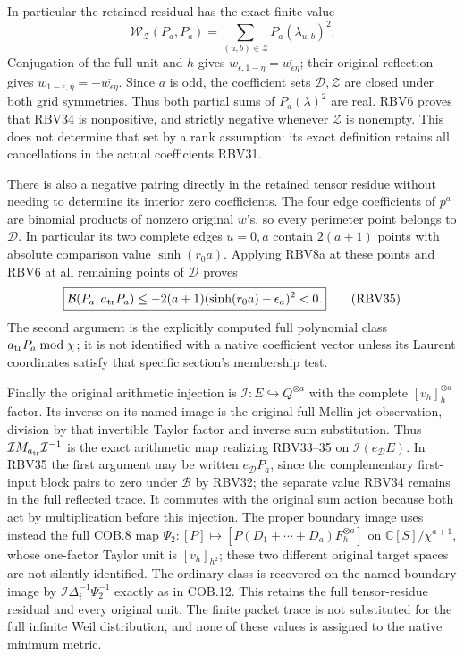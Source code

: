 In particular the retained residual has the exact finite value
\[
\mathcal W_{\mathcal Z}(P_a,P_a)
 =\sum_{(u,b)\in\mathcal Z}P_a(\lambda_{u,b})^2.
\tag{RBV34}
\]
Conjugation of the full unit and $h$ gives
$w_{\epsilon,1-\eta}=\overline{w_{\epsilon\eta}}$;
their original reflection gives
$w_{1-\epsilon,\eta}=-\overline{w_{\epsilon\eta}}$.
Since $a$ is odd, the coefficient sets $\mathcal D,\mathcal Z$
are closed under both grid symmetries. Thus both partial sums of
$P_a(\lambda)^2$ are real. RBV6 proves that RBV34 is nonpositive,
and strictly negative whenever $\mathcal Z$ is nonempty. This
does not determine that set by a rank assumption: its exact definition
retains all cancellations in the actual coefficients RBV31.

There is also a negative pairing directly in the retained tensor
residue without needing to determine its interior zero coefficients.
The four edge coefficients of $p^a$ are binomial products of
nonzero original $w$'s, so every perimeter point belongs to
$\mathcal D$. In particular its two complete edges $u=0,a$
contain $2(a+1)$ points with absolute comparison value
$\sinh(r_0a)$. Applying RBV8a at these points and RBV6 at all
remaining points of $\mathcal D$ proves
\[
\boxed{\mathcal B(P_a,a_{\rm tr}P_a)
 \le-2(a+1)(\sinh(r_0a)-\epsilon_a)^2<0.}\tag{RBV35}
\]
The second argument is the explicitly computed full polynomial
class $a_{\rm tr}P_a\bmod\chi$; it is not identified with a native
coefficient vector unless its Laurent coordinates satisfy that
specific section's membership test.

Finally the original arithmetic injection is
$\mathcal I:E\hookrightarrow Q^{\otimes a}$ with the complete
$[v_h]_h^{\otimes a}$ factor. Its inverse on its named image is
the original full Mellin-jet observation, division by that invertible
Taylor factor and inverse sum substitution. Thus
$\mathcal I M_{a_{\rm tr}}\mathcal I^{-1}$ is the exact arithmetic
map realizing RBV33--35 on $\mathcal I(e_{\mathcal D}E)$.
In RBV35 the first argument may be written $e_{\mathcal D}P_a$,
since the complementary first-input block pairs to zero under
$\mathcal B$ by RBV32; the separate value RBV34 remains in
the full reflected trace.
It commutes with the original sum action because both act by
multiplication before this injection. The proper boundary image
uses instead the full COB.8 map
$\Psi_2:[P]\mapsto[P(D_1+\cdots+D_a)F_h^{\otimes a}]$
on $\mathbb C[S]/\chi^{a+1}$, whose one-factor Taylor unit is
$[v_h]_{h^2}$; these two different original target spaces are not
silently identified. The ordinary class is recovered on the named
boundary image by $\mathcal I\Delta_i^{-1}\Psi_2^{-1}$ exactly
as in COB.12. This retains the full tensor-residue residual and
every original unit. The finite packet trace is not substituted
for the full infinite Weil distribution, and none of these values
is assigned to the native minimum metric.

